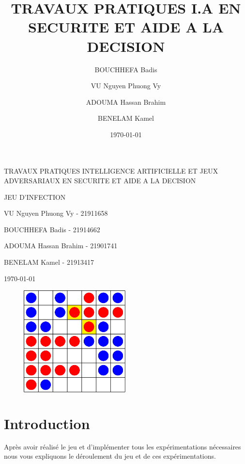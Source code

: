 \documentclass[11pt, pdflatex]{report}
\title{TRAVAUX PRATIQUES I.A EN SECURITE ET AIDE A LA DECISION}
\author{BOUCHHEFA Badis\and VU Nguyen Phuong Vy\and ADOUMA Hassan Brahim\and BENELAM Kamel}
\date{\today}
\begin{document}
\begin{titlepage}
    \vspace*{1em}
    \centering
    {\LARGE TRAVAUX PRATIQUES INTELLIGENCE ARTIFICIELLE ET JEUX ADVERSARIAUX EN SECURITE ET AIDE A LA DECISION\par}
    \vspace{1cm}
    {\scshape\Large JEU D'INFECTION\par}
    \vspace{1cm}
	{\Large VU Nguyen Phuong Vy - 21911658\par}
	{\Large BOUCHHEFA Badis - 21914662 \par}
	{\Large ADOUMA Hassan Brahim - 21901741\par}
	{\Large BENELAM Kamel - 21913417\par}
    \vspace{1cm}
	{\large \today \par}
    \vspace{1cm}

    \begin{figure}[H]
        \centering
        \includegraphics[width=0.5\textwidth]{capture.png}
    \end{figure}
    
\end{titlepage}

\pagebreak

\tableofcontents

\pagebreak
\section{Introduction}
Après avoir réalisé le jeu et d’implémenter tous les expérimentations nécessaires nous vous expliquons le déroulement du jeu et de ces expérimentations.
\end{document}
